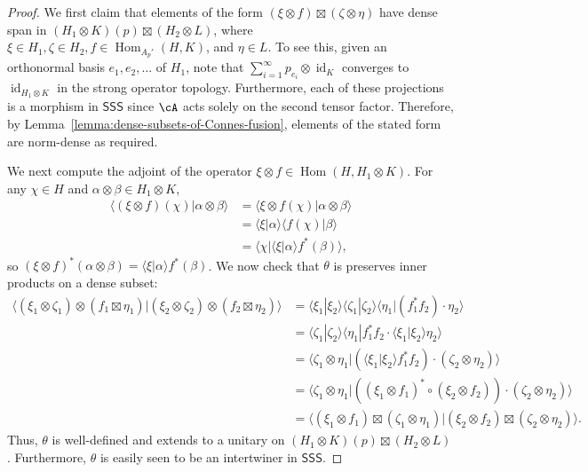 \documentclass[11pt,reqno]{amsart}
\DeclareMathOperator{\Hom}{Hom}
\DeclareMathOperator{\id}{id}
\newcommand{\SSS}{\mathsf{SSS}}
\numberwithin{equation}{section}
\theoremstyle{plain}
\theoremstyle{definition}
\begin{document}
\begin{proof}
    We first claim that elements of the form $(\xi \otimes f) \boxtimes (\zeta \otimes \eta)$ have dense span in $(H_1 \otimes K)(p) \boxtimes (H_2 \otimes L)$, where $\xi \in H_1, \zeta \in H_2, f \in \Hom_{A_p'}(H, K)$, and $\eta \in L$. To see this, given an orthonormal basis $e_1,e_2,\dots$ of $H_1$, note that $\sum_{i=1}^\infty p_{e_i} \otimes \id_{K}$ converges to $\id_{H_1 \otimes K}$ in the strong operator topology. Furthermore, each of these projections is a morphism in $\SSS$ since $\cA$ acts solely on the second tensor factor. Therefore, by Lemma~\ref{lemma:dense-subsets-of-Connes-fusion}, elements of the stated form are norm-dense as required.

    We next compute the adjoint of the operator $\xi \otimes f \in \Hom(H, H_1 \otimes K)$. For any $\chi \in H$ and $\alpha \otimes \beta \in H_1 \otimes K$, 
    \begin{align*}
        \langle (\xi \otimes f)(\chi)| \alpha \otimes \beta\rangle &= \langle \xi \otimes f(\chi)|\alpha \otimes \beta\rangle\\
        &= \langle \xi|\alpha\rangle \langle f(\chi)|\beta\rangle\\
        &=\langle \chi| \langle \xi|\alpha\rangle f^*(\beta)\rangle,
    \end{align*}
    so $(\xi \otimes f)^*(\alpha\otimes\beta)=\langle \xi|\alpha\rangle f^*(\beta)$. We now check that $\theta$ is preserves inner products on a dense subset:
    \begin{align*}
        \langle (\xi_1\otimes\zeta_1) \otimes (f_1 \boxtimes \eta_1)|(\xi_2 \otimes \zeta_2)\otimes (f_2 \boxtimes \eta_2)\rangle &=\langle \xi_1 |\xi_2\rangle \langle \zeta_1|\zeta_2\rangle \langle \eta_1| (f_1^* f_2)\cdot \eta_2\rangle\\
        &=\langle \zeta_1|\zeta_2\rangle \langle \eta_1|  f_1^*f_2\cdot \langle \xi_1|\xi_2\rangle \eta_2\rangle \\
        &=\langle \zeta_1 \otimes \eta_1|(\langle \xi_1|\xi_2\rangle f_1^*f_2) \cdot(\zeta_2 \otimes \eta_2)\rangle\\
        &= \langle \zeta_1 \otimes \eta_1|((\xi_1\otimes f_1)^*\circ (\xi_2\otimes f_2)) \cdot(\zeta_2 \otimes \eta_2)\rangle\\
        &= \langle(\xi_1 \otimes f_1) \boxtimes (\zeta_1 \otimes \eta_1)|(\xi_2 \otimes f_2) \boxtimes (\zeta_2 \otimes \eta_2)\rangle.
    \end{align*}
    Thus, $\theta$ is well-defined and extends to a unitary on $(H_1 \otimes K)(p) \boxtimes (H_2 \otimes L)$. Furthermore, $\theta$ is easily seen to be an intertwiner in $\SSS$.
\end{proof}
\end{document}
